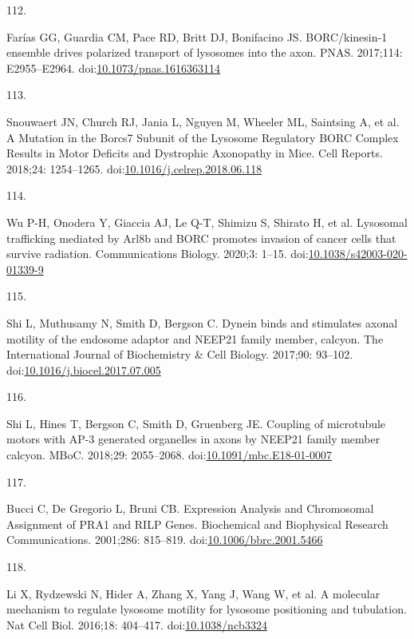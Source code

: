 \documentclass[
  12pt,
  a4paper,
]{book}
\newlength{\cslhangindent}
\newlength{\csllabelwidth}
\newenvironment{CSLReferences}[2] %
 {\begin{list}{}{%
  \setlength{\itemindent}{0pt}
  \setlength{\leftmargin}{0pt}
  \setlength{\parsep}{0pt}
  \ifodd #1
   \setlength{\leftmargin}{\cslhangindent}
   \setlength{\itemindent}{-1\cslhangindent}
  \fi
  \setlength{\itemsep}{#2\baselineskip}}}
 {\end{list}}
\newcommand{\CSLLeftMargin}[1]{\parbox[t]{\csllabelwidth}{\strut#1\strut}}
\newcommand{\CSLRightInline}[1]{\parbox[t]{\linewidth - \csllabelwidth}{\strut#1\strut}}
\begin{document}
\begin{CSLReferences}{0}{1}
\CSLLeftMargin{112. }%
\CSLRightInline{Farías GG, Guardia CM, Pace RD, Britt DJ, Bonifacino JS. {BORC}/kinesin-1 ensemble drives polarized transport of lysosomes into the axon. PNAS. 2017;114: E2955--E2964. doi:\href{https://doi.org/10.1073/pnas.1616363114}{10.1073/pnas.1616363114}}

\CSLLeftMargin{113. }%
\CSLRightInline{Snouwaert JN, Church RJ, Jania L, Nguyen M, Wheeler ML, Saintsing A, et al. A {Mutation} in the {Borcs7 Subunit} of the {Lysosome Regulatory BORC Complex Results} in {Motor Deficits} and {Dystrophic Axonopathy} in {Mice}. Cell Reports. 2018;24: 1254--1265. doi:\href{https://doi.org/10.1016/j.celrep.2018.06.118}{10.1016/j.celrep.2018.06.118}}

\CSLLeftMargin{114. }%
\CSLRightInline{Wu P-H, Onodera Y, Giaccia AJ, Le Q-T, Shimizu S, Shirato H, et al. Lysosomal trafficking mediated by {Arl8b} and {BORC} promotes invasion of cancer cells that survive radiation. Communications Biology. 2020;3: 1--15. doi:\href{https://doi.org/10.1038/s42003-020-01339-9}{10.1038/s42003-020-01339-9}}

\CSLLeftMargin{115. }%
\CSLRightInline{Shi L, Muthusamy N, Smith D, Bergson C. Dynein binds and stimulates axonal motility of the endosome adaptor and {NEEP21} family member, calcyon. The International Journal of Biochemistry \& Cell Biology. 2017;90: 93--102. doi:\href{https://doi.org/10.1016/j.biocel.2017.07.005}{10.1016/j.biocel.2017.07.005}}

\CSLLeftMargin{116. }%
\CSLRightInline{Shi L, Hines T, Bergson C, Smith D, Gruenberg JE. Coupling of microtubule motors with {AP-3} generated organelles in axons by {NEEP21} family member calcyon. MBoC. 2018;29: 2055--2068. doi:\href{https://doi.org/10.1091/mbc.E18-01-0007}{10.1091/mbc.E18-01-0007}}

\CSLLeftMargin{117. }%
\CSLRightInline{Bucci C, De Gregorio L, Bruni CB. Expression {Analysis} and {Chromosomal Assignment} of {PRA1} and {RILP Genes}. Biochemical and Biophysical Research Communications. 2001;286: 815--819. doi:\href{https://doi.org/10.1006/bbrc.2001.5466}{10.1006/bbrc.2001.5466}}

\CSLLeftMargin{118. }%
\CSLRightInline{Li X, Rydzewski N, Hider A, Zhang X, Yang J, Wang W, et al. A molecular mechanism to regulate lysosome motility for lysosome positioning and tubulation. Nat Cell Biol. 2016;18: 404--417. doi:\href{https://doi.org/10.1038/ncb3324}{10.1038/ncb3324}}


\end{CSLReferences}
\end{document}
